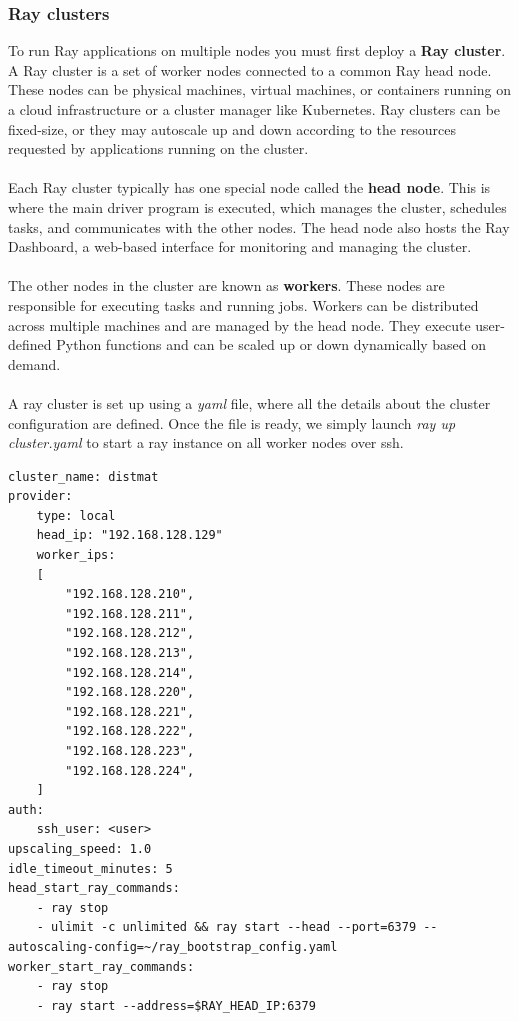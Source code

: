 \subsubsection{Ray clusters}
To run Ray applications on multiple nodes you must first deploy a \textbf{Ray cluster}. A Ray cluster is a set of worker nodes connected to a common Ray head node. These nodes can be physical machines, virtual machines, or containers running on a cloud infrastructure or a cluster manager like Kubernetes. Ray clusters can be fixed-size, or they may autoscale up and down according to the resources requested by applications running on the cluster.
\\\\
Each Ray cluster typically has one special node called the \textbf{head node}. This is where the main driver program is executed, which manages the cluster, schedules tasks, and communicates with the other nodes. The head node also hosts the Ray Dashboard, a web-based interface for monitoring and managing the cluster.
\\\\
The other nodes in the cluster are known as \textbf{workers}. These nodes are responsible for executing tasks and running jobs. Workers can be distributed across multiple machines and are managed by the head node. They execute user-defined Python functions and can be scaled up or down dynamically based on demand.
\\\\
A ray cluster is set up using a \textit{yaml} file, where all the details about the cluster configuration are defined. Once the file is ready, we simply launch \textit{ray up cluster.yaml} to start a ray instance on all worker nodes over ssh.
\begin{lstlisting}[caption={cluster.yaml}]
cluster_name: distmat
provider:
    type: local
    head_ip: "192.168.128.129"
    worker_ips:
    [
        "192.168.128.210",
        "192.168.128.211",
        "192.168.128.212",
        "192.168.128.213",
        "192.168.128.214",
        "192.168.128.220",
        "192.168.128.221",
        "192.168.128.222",
        "192.168.128.223",
        "192.168.128.224",
    ]
auth:
    ssh_user: <user>
upscaling_speed: 1.0
idle_timeout_minutes: 5
head_start_ray_commands:
    - ray stop
    - ulimit -c unlimited && ray start --head --port=6379 --autoscaling-config=~/ray_bootstrap_config.yaml
worker_start_ray_commands:
    - ray stop
    - ray start --address=$RAY_HEAD_IP:6379
\end{lstlisting}
\pagebreak
